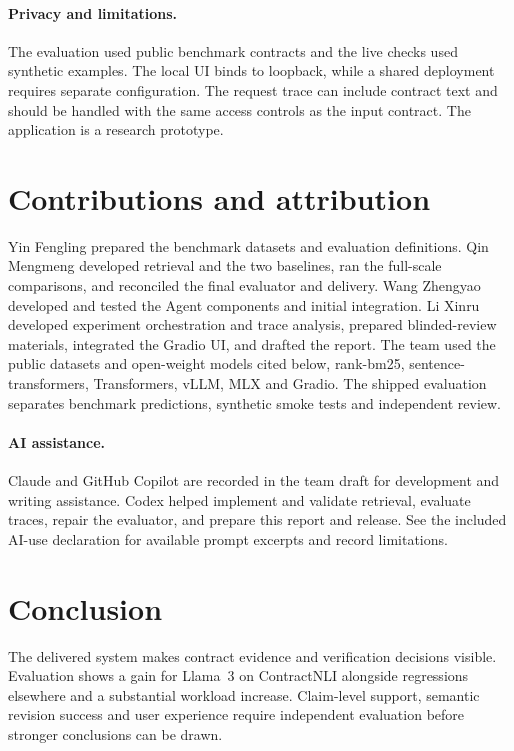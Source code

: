 \documentclass{article}
\begin{document}
\paragraph{Privacy and limitations.} The evaluation used public benchmark contracts and the live checks used synthetic examples. The local UI binds to loopback, while a shared deployment requires separate configuration. The request trace can include contract text and should be handled with the same access controls as the input contract. The application is a research prototype.

\section{Contributions and attribution}
Yin Fengling prepared the benchmark datasets and evaluation definitions. Qin Mengmeng developed retrieval and the two baselines, ran the full-scale comparisons, and reconciled the final evaluator and delivery. Wang Zhengyao developed and tested the Agent components and initial integration. Li Xinru developed experiment orchestration and trace analysis, prepared blinded-review materials, integrated the Gradio UI, and drafted the report. The team used the public datasets and open-weight models cited below, rank-bm25, sentence-transformers, Transformers, vLLM, MLX and Gradio. The shipped evaluation separates benchmark predictions, synthetic smoke tests and independent review.

\paragraph{AI assistance.} Claude and GitHub Copilot are recorded in the team draft for development and writing assistance. Codex helped implement and validate retrieval, evaluate traces, repair the evaluator, and prepare this report and release. See the included AI-use declaration for available prompt excerpts and record limitations.

\section{Conclusion}
The delivered system makes contract evidence and verification decisions visible. Evaluation shows a gain for Llama~3 on ContractNLI alongside regressions elsewhere and a substantial workload increase. Claim-level support, semantic revision success and user experience require independent evaluation before stronger conclusions can be drawn.
\end{document}
